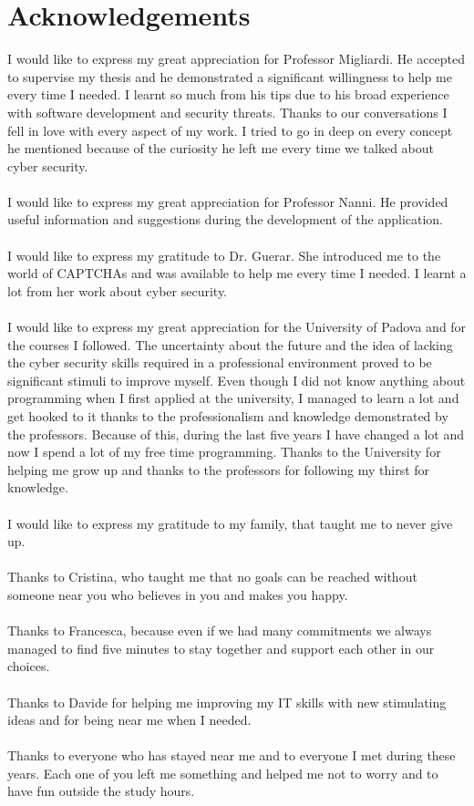 \chapter*{Acknowledgements}
\renewcommand\chaptermark[1]{\markboth{\uppercase{#1}}{}}
\chaptermark{Acknowledgments}
I would like to express my great appreciation for Professor Migliardi. He accepted to supervise my thesis and he demonstrated a significant willingness to
help me every time I needed. I learnt so much from his tips due to his broad experience with software development and security threats. Thanks to our conversations I fell in love with every aspect of my work. I tried to go in deep on every concept he mentioned because of the curiosity he left me every time we talked about cyber security.\\\\
I would like to express my great appreciation for Professor Nanni. He provided useful information and suggestions during the development of the application.\\\\
I would like to express my gratitude to Dr. Guerar. She introduced me to the world of CAPTCHAs and was available to help me every time I needed. I learnt a lot from her work about cyber security.\\\\
I would like to express my great appreciation for the University of Padova and for the courses I followed. The uncertainty about the future and the idea of lacking the cyber security skills required in a professional environment proved to be significant stimuli to improve myself. Even though I did not know anything about programming when I first applied at the university, I managed to learn a lot and get hooked to it thanks to the professionalism and knowledge demonstrated by the professors. Because of this, during the last five years I have changed a lot and now I spend a lot of my free time programming. Thanks to the University for helping me grow up and thanks to the professors for following my thirst for knowledge.\\\\
I would like to express my gratitude to my family, that taught me to never give up.\\\\
Thanks to Cristina, who taught me that no goals can be reached without someone near you who believes in you and makes you happy.\\\\
Thanks to Francesca, because even if we had many commitments we always managed to find five minutes to stay together and support each other in our choices.\\\\
Thanks to Davide for helping me improving my IT skills with new stimulating ideas and for being near me when I needed.\\\\
Thanks to everyone who has stayed near me and to everyone I met during these years. Each one of you left me something and helped me not to worry and to have 
fun outside the study hours.\\\\